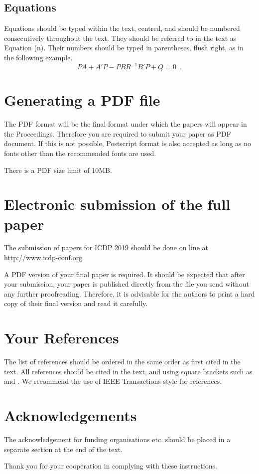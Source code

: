 \documentclass[10pt]{article}
\begin{document}
\subsection{Equations}
Equations should be typed within the text, centred, and should
be numbered consecutively throughout the text. They should
be referred to in the text as Equation (n). Their numbers
should be typed in parentheses, flush right, as in the following
example.
\begin{equation}
	    PA + A'P - PBR^{-1}B'P + Q  =  0 \enspace.
\end{equation}

\section{Generating a {PDF} file}
The PDF format will be the final format under which the
papers will appear in the Proceedings. Therefore you are
required to submit your paper as PDF document. If this is not
possible, Postscript format is also accepted as long as no fonts
other than the recommended fonts are used.

There is a PDF size limit of 10MB.

\section{Electronic submission of the full paper}
The submission of papers for ICDP 2019 should be done on
line at http://www.icdp-conf.org

A PDF version of your final paper is required. It should
be expected that after your submission, your paper is
published directly from the file you send without any further
proofreading. Therefore, it is advisable for the authors to
print a hard copy of their final version and read it carefully.

\section{Your References}
The list of references should be ordered in the same order as
first cited in the text. All references should be cited in the
text, and using square brackets such as \cite{ref01} and \cite{ref01,ref02}. We
recommend the use of IEEE Transactions style for references.

\section*{Acknowledgements}
The acknowledgement for funding organisations etc. should
be placed in a separate section at the end of the text.



Thank you for your cooperation in complying with these
instructions.



\end{document}
